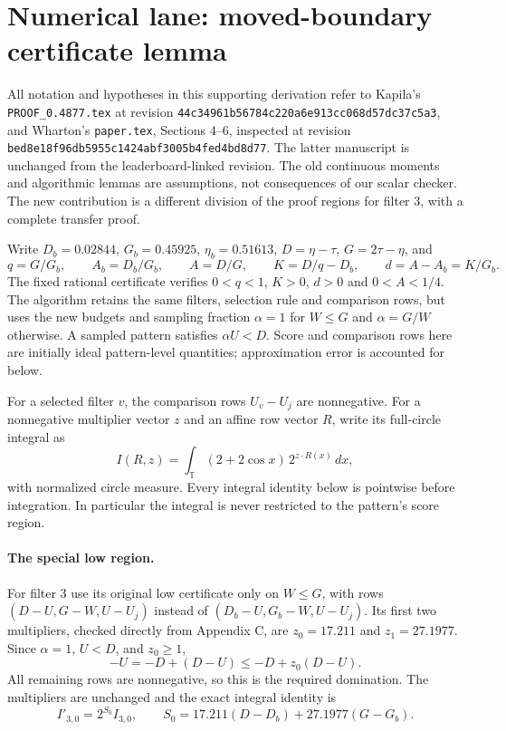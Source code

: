 \section{Numerical lane: moved-boundary certificate lemma}
All notation and hypotheses in this supporting derivation refer to Kapila's
\texttt{PROOF\_0.4877.tex} at revision
\texttt{44c34961b56784c220a6e913cc068d57dc37c5a3}, and Wharton's
\texttt{paper.tex}, Sections 4--6, inspected at revision
\texttt{bed8e18f96db5955c1424abf3005b4fed4bd8d77}.
The latter manuscript is unchanged from the leaderboard-linked revision.
The old continuous moments and algorithmic lemmas are assumptions, not
consequences of our scalar checker. The new contribution is a different
division of the proof regions for filter 3, with a complete transfer proof.

Write $D_b=0.02844$, $G_b=0.45925$, $\eta_b=0.51613$,
$D=\eta-\tau$, $G=2\tau-\eta$, and
\[
 q=G/G_b,\qquad A_b=D_b/G_b,\qquad A=D/G,\qquad
 K=D/q-D_b,\qquad d=A-A_b=K/G_b.
\]
The fixed rational certificate verifies $0<q<1$, $K>0$, $d>0$ and
$0<A<1/4$. The algorithm retains the same filters, selection rule and
comparison rows, but uses the new budgets and sampling fraction
$\alpha=1$ for $W\le G$ and $\alpha=G/W$ otherwise. A sampled pattern
satisfies $\alpha U<D$. Score and comparison rows here are initially ideal
pattern-level quantities; approximation error is accounted for below.

For a selected filter $v$, the comparison rows $U_v-U_j$ are nonnegative.
For a nonnegative multiplier vector $z$ and an affine row vector $R$,
write its full-circle integral as
\[
 I(R,z)=\int_{\mathbb T}(2+2\cos x)\,2^{z\cdot R(x)}\,dx,
\]
with normalized circle measure. Every integral identity below is pointwise
before integration. In particular the integral is never restricted to the
pattern's score region.

\paragraph{The special low region.}
For filter 3 use its original low certificate only on $W\le G$, with rows
$(D-U,G-W,U-U_j)$ instead of $(D_b-U,G_b-W,U-U_j)$.
Its first two multipliers, checked directly from Appendix C, are
$z_0=17.211$ and $z_1=27.1977$. Since $\alpha=1$, $U<D$, and $z_0\ge1$,
\[
 -U=-D+(D-U)\le -D+z_0(D-U).
\]
All remaining rows are nonnegative, so this is the required domination.
The multipliers are unchanged and the exact integral identity is
\[
 I'_{3,0}=2^{S_0}I_{3,0},\qquad
 S_0=17.211(D-D_b)+27.1977(G-G_b).
\]

